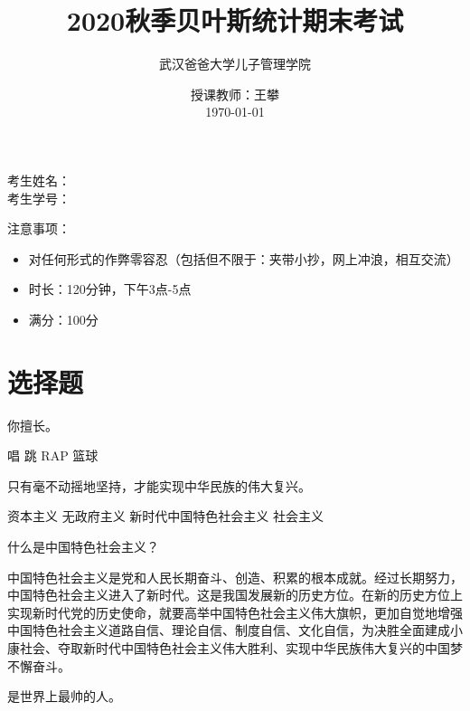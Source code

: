 \documentclass[addpoints,answers]{exam}
\begin{document}
\title{2020秋季贝叶斯统计期末考试}
\author{武汉爸爸大学儿子管理学院}
\date{授课教师：王攀\\
\vspace*{0.4cm}
\today
}
\maketitle


\vspace*{\fill}
\doublespacing
\begin{center}
	考生姓名：\fillin[][3cm]\\
	考生学号：\fillin[][3cm]
\end{center}

\linespread{1.5}

\vspace*{\fill}
\begin{framed}
  注意事项：
  
  \begin{itemize}
  	\item 对任何形式的作弊零容忍（包括但不限于：夹带小抄，网上冲浪，相互交流）
  	\item 时长：120分钟，下午3点-5点
  	\item 满分：100分
  \end{itemize}
  
\end{framed}


\clearpage
\section{选择题}

\begin{questions}

\question[10] 你擅长\fillin。

\begin{oneparchoices}
\correctchoice 唱
\correctchoice 跳
\correctchoice RAP
\choice 篮球
\end{oneparchoices}

\question[80] 只有毫不动摇地坚持\fillin，才能实现中华民族的伟大复兴。

\begin{choices}
\choice 资本主义
\choice 无政府主义
\correctchoice 新时代中国特色社会主义
\choice 社会主义
\end{choices}

\question[10] 什么是中国特色社会主义？

\begin{solution}
中国特色社会主义是党和人民长期奋斗、创造、积累的根本成就。经过长期努力，中国特色社会主义进入了新时代。这是我国发展新的历史方位。在新的历史方位上实现新时代党的历史使命，就要高举中国特色社会主义伟大旗帜，更加自觉地增强中国特色社会主义道路自信、理论自信、制度自信、文化自信，为决胜全面建成小康社会、夺取新时代中国特色社会主义伟大胜利、实现中华民族伟大复兴的中国梦不懈奋斗。
\end{solution}

\question[10] \fillin[Xovee][2cm]是世界上最帅的人。

\end{questions}
\end{document}
